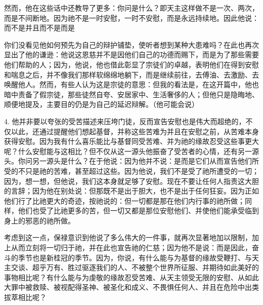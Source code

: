然而，他在这些话中还教导了更多：你问是什么？即天主这样做不是一次、两次，而是不间断地。因为祂不是一时安慰，一时不安慰，而是永远持续地。因此他说：而不是并且而不是而是\par

你们没看见他如何预先为自己的辩护铺垫，使听者想到某种大患难吗？在此也再次显出了他的谦逊：他说这恩慈并不是因他们自己的功德而赐下，而是为了那些需要他们帮助的人；因为，他说，他也借此彰显了宗徒们的卓越，表明他们在得到安慰和喘息之后，并不像我们那样软绵绵地躺下，而是继续前往，去傅油、去激励、去唤醒他人。然而，有些人认为这是宗徒的意思：但我的看法是，在这开篇中，他也暗中责备了假宗徒，那些徒然自夸、安居家中、生活奢侈的人；但他只是隐晦地、顺便地提及，主要目的仍是为自己的延迟辩解。（他可能会说）\par

4. 他并非要以夸张的受苦描述来压垮门徒，反而宣告安慰也是伟大而超绝的，不仅以此，还通过提醒他们想起基督，并称这些苦难为并且在安慰之前，从苦难本身获得安慰。因为我有什么喜乐能比与基督同受苦难、并为祂的缘故忍受这些事更大呢？什么安慰能与这相比？但不仅从这一源头他振奋了受苦者的心情，还有另一源头。你问另一源头是什么？在于他说：因为他并不说：是而是它们从而宣告他们所受的不只是祂的苦难，甚至超过这些。因为他说，我们不是受了祂所遭受的一切；因为，想一想，但他说，我们这本身就足够了安慰。现在不要让任何人指责这大胆的言辞；因为他在别处说：但那既不是出于胆大，也不是出于任何狂妄。因为正如他们行了比祂更大的奇迹，按祂说的：但一切都是那在他们内行事的祂所做；同样，他们也受了比祂更多的苦，但一切又都是那位安慰他们、并使他们能承受临到身上的邪恶的祂所做。\par

考虑到这一点，保禄意识到他说了多么伟大的一件事，就再次显著地加以限制，加上从而立刻将一切归于祂，并在此也宣告祂的仁慈；因为他不是说：而是因此，奋斗的季节也是新桂冠的季节。因为，你说，有什么能与为基督的缘故受鞭打、与天主交谈、超乎万有、胜过驱逐我们的人、不被整个世界所征服、并期待如此美好的事物相比呢？有什么能与为虔敬的缘故忍受苦难、从天主领受无限的安慰、从如此大罪中被救赎、被视配得圣神、被圣化和成义、不畏惧任何人、并且在危险中出类拔萃相比呢？\par


